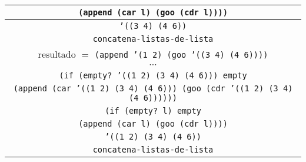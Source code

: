 \documentclass[letterpaper,11pt]{article}
\begin{document}
\begin{enumerate}
\begin{enumerate}
\begin{center}
\begin{tabular}{|c|}
                \texttt{(append (car l) (goo (cdr l))))} \\
                \hline
                \texttt{'((3 4) (4 6))} \\
                \hline
                \texttt{concatena-listas-de-lista} \\
                \hline
                \hline
                resultado $=$ \texttt{(append '(1 2) (goo '((3 4) (4 6))))}  \\
                \hline
                $\cdots$ \\
                \hline
                \texttt{(if (empty? '((1 2) (3 4) (4 6))) empty} \\
                \texttt{(append (car '((1 2) (3 4) (4 6))) 
                (goo (cdr '((1 2) (3 4) (4 6))))))} \\
                \hline
                \texttt{(if (empty? l) empty} \\
                \texttt{(append (car l) (goo (cdr l))))} \\
                \hline
                \texttt{'((1 2) (3 4) (4 6))} \\
                \hline
                \texttt{concatena-listas-de-lista} \\
                \hline
            \end{tabular}
        \end{center}


\end{enumerate}
\end{enumerate}
\end{document}
